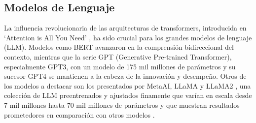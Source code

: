 \documentclass[12pt,twocolumn]{article}
\begin{document}
\subsection{Modelos de Lenguaje}
La influencia revolucionaria de las arquitecturas de transformers, introducida en ‘Attention is All You Need’ \parencite{vaswani2017attention}, ha sido crucial para los grandes modelos de lenguaje (LLM). 
Modelos como BERT \parencite{devlin2019bert} avanzaron en la comprensión bidireccional del contexto, mientras que la serie GPT (Generative Pre-trained Transformer), especialmente GPT3, con un modelo de 175 mil millones de parámetros y su sucesor GPT4 \parencite{achiam2023gpt} se mantienen a la cabeza de la innovación y desempeño. 
Otros de los modelos a destacar son los presentados por MetaAI, LLaMA \parencite{touvron2023llama} y LLaMA2 \parencite{touvron2023llama}, una colección de LLM preentrenados y ajustados finamente que varían en escala desde 7 mil millones hasta 70 mil millones de parámetros y que muestran resultados prometedores en comparación con otros modelos \parencite{lopez2024generacion}.
\end{document}

